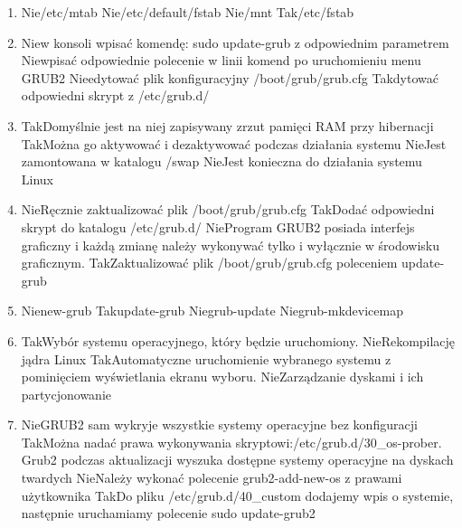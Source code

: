 \begin{enumerate}
	\item {}%
	{Nie}{/etc/mtab}%
	{Nie}{/etc/default/fstab}%
	{Nie}{/mnt}%
	{Tak}{/etc/fstab}
	
	\item {}%
	{Nie}{w konsoli wpisać komendę: sudo update-grub z odpowiednim parametrem}%
	{Nie}{wpisać odpowiednie polecenie w linii komend po uruchomieniu menu GRUB2}%
	{Nie}{edytować plik konfiguracyjny /boot/grub/grub.cfg}%
	{Tak}{dytować odpowiedni skrypt z /etc/grub.d/}

	\item {}%
	{Tak}{Domyślnie jest na niej zapisywany zrzut pamięci RAM przy hibernacji}%
	{Tak}{Można go aktywować i dezaktywować podczas działania systemu}%
	{Nie}{Jest zamontowana w katalogu /swap}%
	{Nie}{Jest konieczna do działania systemu Linux}
	
	\item {}%
	{Nie}{Ręcznie zaktualizować plik /boot/grub/grub.cfg}%
	{Tak}{Dodać odpowiedni skrypt do katalogu /etc/grub.d/}%
	{Nie}{Program GRUB2 posiada interfejs graficzny i każdą zmianę należy wykonywać tylko i wyłącznie w środowisku graficznym.}%
	{Tak}{Zaktualizować plik /boot/grub/grub.cfg poleceniem update-grub}

	\item {}%
	{Nie}{new-grub}%
	{Tak}{update-grub}%
	{Nie}{grub-update}%
	{Nie}{grub-mkdevicemap}
	
	\item {}%
	{Tak}{Wybór systemu operacyjnego, który będzie uruchomiony.}%
	{Nie}{Rekompilację jądra Linux}%
	{Tak}{Automatyczne uruchomienie wybranego systemu z pominięciem wyświetlania ekranu wyboru.}%
	{Nie}{Zarządzanie dyskami i ich partycjonowanie}

	\item {}%
	{Nie}{GRUB2 sam wykryje wszystkie systemy operacyjne bez konfiguracji}%
	{Tak}{Można nadać prawa wykonywania skryptowi:/etc/grub.d/30\_os-prober. Grub2 podczas aktualizacji wyszuka dostępne systemy operacyjne na dyskach twardych}%
	{Nie}{Należy wykonać polecenie grub2-add-new-os z prawami użytkownika}%
	{Tak}{Do pliku /etc/grub.d/40\_custom dodajemy wpis o systemie, następnie uruchamiamy polecenie sudo update-grub2}
	

\end{enumerate}
